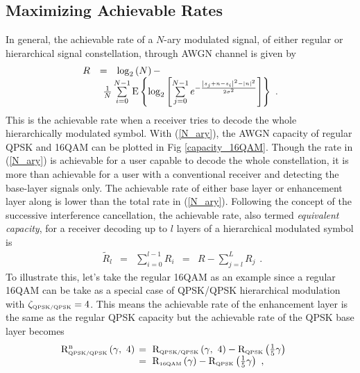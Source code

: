 \documentclass[conference]{IEEEtran}
\begin{document}
\subsection{Maximizing Achievable Rates~\label{Info_Theory}}
In general, the achievable rate of a $N$-ary modulated signal, of
either regular or hierarchical signal constellation, through AWGN
channel is given by~\cite{Unge82}
\begin{equation}
\begin{array}{lcl}
R&=&\log_{2}\left(N\right)-\\
&&\hspace{-0.20in}\frac{1}{N}\sum\limits_{i=0}^{N-1}\mbox{E}\left\{\log_{2}\left[\sum\limits_{j=0}^{N-1}e^{-\frac{\left|s_{j}+n-s_{i}\right|^2-\left|n\right|^2}{2\sigma^2}}\right]\right\}\
.
\end{array}\label{N_ary}
\end{equation}
\noindent This is the achievable rate when a receiver tries to
decode the whole hierarchically modulated symbol. With
(\ref{N_ary}), the AWGN capacity of regular QPSK and 16QAM can be
plotted in Fig \ref{capacity_16QAM}. Though the rate in
(\ref{N_ary}) is achievable for a user capable to decode the whole
constellation, it is more than achievable for a user with a
conventional receiver and detecting the base-layer signals only.
The achievable rate of either base layer or enhancement layer
along is lower than the total rate in (\ref{N_ary}). Following the
concept of the successive interference cancellation, the
achievable rate, also termed {\em equivalent capacity}, for a
receiver decoding up to $l$ layers of a hierarchical modulated
symbol is~\cite{Huber94}
\begin{equation}
\begin{array}{rcccl}
\tilde{R}_{l}&=&\sum\limits_{i=0}^{l-1}R_{i}& = &
R-\sum\limits_{j=l}^{L}{R}_{j}
\end{array}.\label{R_equiv}
\end{equation}
\noindent To illustrate this, let's take the regular 16QAM as an
example since a regular 16QAM can be take as a special case of
QPSK/QPSK hierarchical modulation with $\zeta_{\mbox{\tiny
QPSK/QPSK}}=4$. This means the achievable rate of the enhancement
layer is the same as the regular QPSK capacity but the achievable
rate of the QPSK base layer becomes
\begin{equation}\hspace{-0.2in}
\begin{array}{rl}
{\rm R}_{\mbox{\tiny QPSK/QPSK}}^{\mbox{\tiny B}}\left(\gamma,\
4\right)&\hspace{-0.08in}=\ {\rm R}_{\mbox{\tiny
QPSK/QPSK}}\left(\gamma,\
4\right)-{\rm R}_{\mbox{\tiny QPSK}} \left(\frac{1}{5}\gamma\right)\\
&\hspace{-0.08in}=\ {\rm R}_{\mbox{\tiny
16QAM}}\left(\gamma\right)-{\rm R}_{\mbox{\tiny
QPSK}}\left(\frac{1}{5}\gamma\right)\ ,
\end{array}\label{R_16QAM_B1}
\end{equation}
\end{document}
